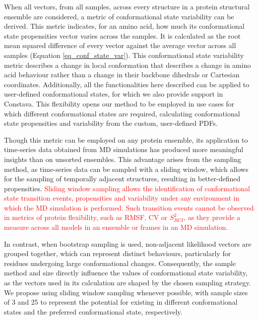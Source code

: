When all vectors, from all samples, across every structure in a protein structural ensemble are considered, a metric of conformational state variability can be derived. This metric indicates, for an amino acid, how much its conformational state propensities vector varies across the samples. It is calculated as the root mean squared difference of every vector against the average vector across all samples (Equation \ref{eq_conf_state_var}). This conformational state variability metric describes a change in local conformation that describes a change in amino acid behaviour rather than a change in their backbone dihedrals or Cartesian coordinates. Additionally, all the functionalities here described can be applied to user-defined conformational states, for which we also provide support in Constava. This flexibility opens our method to be employed in use cases for which different conformational states are required, calculating conformational state propensities and variability from the custom, user-defined PDFs.

Though this metric can be employed on any protein ensemble, its application to time-series data obtained from MD simulations has produced more meaningful insights than on unsorted ensembles. This advantage arises from the sampling method, as time-series data can be sampled with a sliding window, which allows for the sampling of temporally adjacent structures, resulting in better-defined propensities. \textcolor{red}{Sliding window sampling allows the identification of conformational state transition events, propensities and variability under any environment in which the MD simulation is performed. Such transition events cannot be observed in metrics of protein flexibility, such as RMSF, CV or $S^{2}_{RCI}$, as they provide a measure across all models in an ensemble or frames in an MD simulation.} 

In contrast, when bootstrap sampling is used, non-adjacent likelihood vectors are grouped together, which can represent distinct behaviours, particularly for residues undergoing large conformational changes. Consequently, the sample method and size directly influence the values of conformational state variability, as the vectors used in its calculation are shaped by the chosen sampling strategy. We propose using sliding window sampling whenever possible, with sample sizes of 3 and 25 to represent the potential for existing in different conformational states and the preferred conformational state, respectively.


